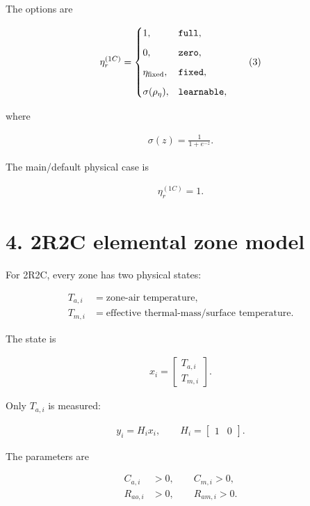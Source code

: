 \documentclass[11pt]{article}
\begin{document}
The options are

\begin{align}
\eta_r^{(1C)}=
\begin{cases}
1, & \texttt{full},\\[2mm]
0, & \texttt{zero},\\[2mm]
\eta_{\rm fixed}, & \texttt{fixed},\\[2mm]
\sigma(\rho_\eta), & \texttt{learnable},
\end{cases}
\tag{3}
\end{align}

where

\begin{align}
\sigma(z)=\frac{1}{1+e^{-z}}.
\end{align}

The main/default physical case is

\begin{align}
\boxed{\eta_r^{(1C)}=1.}
\end{align}

\section*{4. 2R2C elemental zone model}

For 2R2C, every zone has two physical states:

\begin{align}
T_{a,i}&=\text{zone-air temperature},\\
T_{m,i}&=\text{effective thermal-mass/surface temperature}.
\end{align}

The state is

\begin{align}
\boxed{
x_i=
\begin{bmatrix}
T_{a,i}\\
T_{m,i}
\end{bmatrix}.
}
\end{align}

Only \(T_{a,i}\) is measured:

\begin{align}
\boxed{
y_i=
H_ix_i,
\qquad
H_i=
\begin{bmatrix}
1&0
\end{bmatrix}.
}
\tag{4}
\end{align}

The parameters are

\begin{align}
C_{a,i}&>0,
\qquad
C_{m,i}>0,
\\
R_{ao,i}&>0,
\qquad
R_{am,i}>0.
\end{align}
\end{document}
